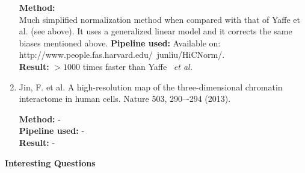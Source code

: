 \documentclass[a4paper,12pt]{article}
\begin{document}
\begin{enumerate}
    \textbf{Method:}\\ Much simplified normalization method when compared with that of Yaffe et al. (see above). It uses a generalized linear model and it corrects the same biases mentioned above.
	\textbf{Pipeline used:} Available on: http://www.people.fas.harvard.edu/~junliu/HiCNorm/.\\ 
    \textbf{Result:} $>1000$ times faster than Yaffe ~\emph{et al.}\\

	\item Jin, F. et al. A high-resolution map of the three-dimensional chromatin interactome in human cells. Nature 503, 290–-294 (2013).
    
    \textbf{Method:} - \\
	\textbf{Pipeline used:} - \\
	\textbf{Result:} - \\

\end{enumerate}

\newpage

\textbf{Interesting Questions}\\
\end{document}
